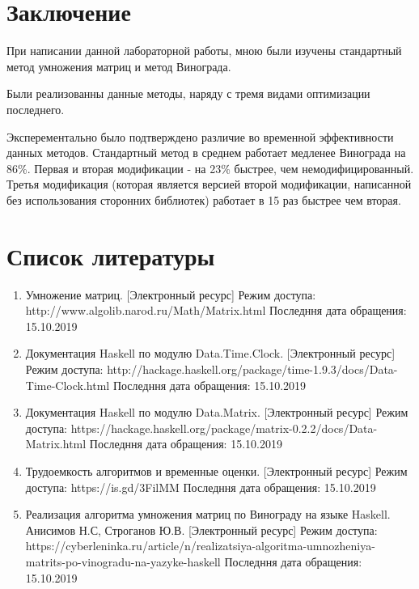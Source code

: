 \documentclass[12pt]{report}
\begin{document}
\chapter*{Заключение}

При написании данной лабораторной работы, мною были изучены стандартный метод умножения матриц и метод Винограда.

Были реализованны данные методы, наряду с тремя видами оптимизации последнего.

Эксперементально было подтверждено различие во временной эффективности данных методов.
Стандартный метод в среднем работает медленее Винограда на 86\%. Первая и вторая модификации - на 23\% быстрее, чем немодифицированный.
Третья модификация (которая является версией второй модификации, написанной без использования сторонних библиотек) работает в 15 раз быстрее чем вторая.

\chapter*{Список литературы}
\begin{enumerate}
	\item Умножение матриц. [Электронный ресурс] Режим доступа: http://www.algolib.narod.ru/Math/Matrix.html Последння дата обращения: 15.10.2019
	\item Документация Haskell по модулю Data.Time.Clock. [Электронный ресурс] Режим доступа: http://hackage.haskell.org/package/time-1.9.3/docs/Data-Time-Clock.html Последння дата обращения: 15.10.2019
	\item Документация Haskell по модулю Data.Matrix. [Электронный ресурс] Режим доступа: https://hackage.haskell.org/package/matrix-0.2.2/docs/Data-Matrix.html Последння дата обращения: 15.10.2019
	\item Трудоемкость алгоритмов и временные оценки. [Электронный ресурс] Режим доступа: https://is.gd/3FilMM Последння дата обращения: 15.10.2019
	\item Реализация алгоритма умножения матриц по Винограду на языке Haskell. Анисимов Н.С, Строганов Ю.В. [Электронный ресурс] Режим доступа: https://cyberleninka.ru/article/n/realizatsiya-algoritma-umnozheniya-matrits-po-vinogradu-na-yazyke-haskell Последння дата обращения: 15.10.2019
\end{enumerate}
\end{document}
